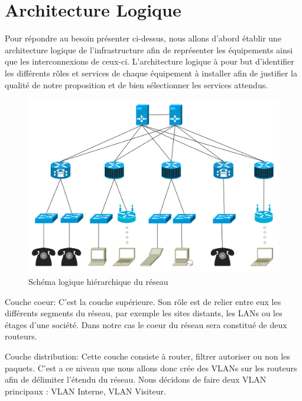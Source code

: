 \section{Architecture Logique}

Pour répondre au besoin présenter ci-dessus, nous allons d'abord établir une architecture logique de l'infrastructure afin de représenter les équipements ainsi que les interconnexions de ceux-ci.
L'architecture logique à pour but d'identifier les différents rôles et services de chaque équipement à installer afin de justifier la qualité de notre proposition et de bien sélectionner les services attendus.

%
%

\begin{figure}[!ht]
    \center
    \includegraphics[width=1\textwidth]{./images/schema-logique.png}
    \caption{Schéma logique hiérarchique du réseau}
\end{figure}

Couche coeur:
C’est la couche supérieure.
Son rôle est de relier entre eux les différents segments du réseau, par exemple les sites distants, les LANs ou les étages d'une société.
Dans notre cas le coeur du réseau sera constitué de deux routeurs.

Couche distribution:
Cette couche consiste à router, filtrer autoriser ou non les paquets.
C'est a ce niveau que nous allons donc crée des VLANs sur les routeurs afin de délimiter l'étendu du réseau.
Nous décidons de faire deux VLAN principaux : VLAN Interne, VLAN Visiteur.

